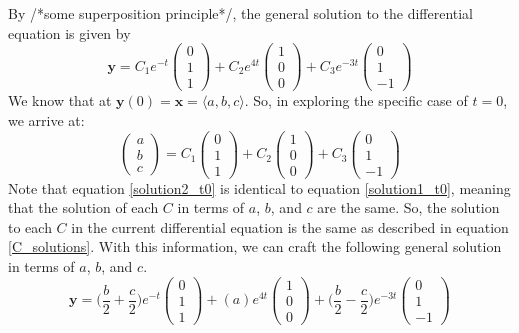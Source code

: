 \documentclass[a4paper]{article}
\newcommand{\myvec}[1]{\langle#1\rangle}
\begin{document}
By /*some superposition principle*/, the general solution to the differential equation is given by
\begin{equation}
		\mathbf{y} = C_1e^{-t} \begin{pmatrix} 0 \\ 1 \\ 1 \end{pmatrix}
	+ C_2e^{4t} \begin{pmatrix} 1 \\ 0 \\ 0 \end{pmatrix}
	+ C_3e^{-3t} \begin{pmatrix} 0 \\ 1 \\ -1 \end{pmatrix}
\end{equation}
We know that at $\textbf{y}(0) = \textbf{x} = \myvec{a,b,c}$. So, in exploring the specific case of $t=0$, we arrive at:
\begin{equation}
\begin{pmatrix} a \\ b \\ c \end{pmatrix} = C_1\begin{pmatrix} 0 \\ 1 \\ 1 \end{pmatrix}
+ C_2\begin{pmatrix} 1 \\ 0 \\ 0 \end{pmatrix}
+ C_3\begin{pmatrix} 0 \\ 1 \\ -1 \end{pmatrix}
\label{solution2_t0}
\end{equation}
Note that equation \ref{solution2_t0} is identical to equation \ref{solution1_t0}, meaning that the solution of each $C$ in terms of $a$, $b$, and $c$ are the same. So, the solution to each $C$ in the current differential equation is the same as described in equation \ref{C_solutions}. With this information, we can craft the following general solution in terms of $a$, $b$, and $c$.
\begin{equation}
\mathbf{y} = \bigg(\frac{b}{2}+\frac{c}{2}\bigg)e^{-t} \begin{pmatrix} 0 \\ 1 \\ 1 \end{pmatrix}
+ (a)e^{4t} \begin{pmatrix} 1 \\ 0 \\ 0 \end{pmatrix}
+ \bigg(\frac{b}{2}-\frac{c}{2}\bigg)e^{-3t} \begin{pmatrix} 0 \\ 1 \\ -1 \end{pmatrix}
\label{init_cond_solution2}
\end{equation}
\end{document}
